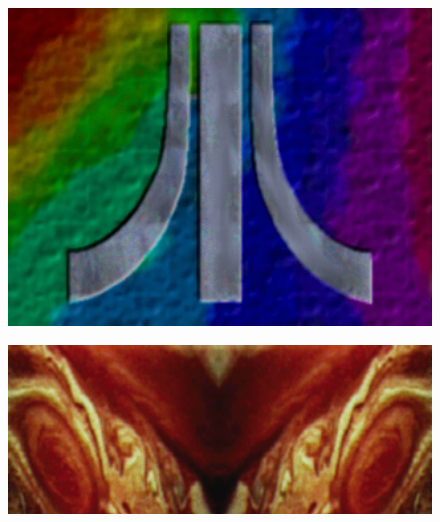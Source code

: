 \begin{minipage}[b]{0.48\linewidth}
\begin{figure}[H]
    \centering
    \begin{adjustbox}{width=6cm,center}
      \includegraphics[width=12cm]{cry/beasty5.png}%
    \end{adjustbox}
  \caption*{}
\end{figure}
\end{minipage}
\begin{minipage}[b]{0.48\linewidth}
\begin{figure}[H]
    \centering
    \begin{adjustbox}{width=6cm,center}
      \includegraphics[width=12cm]{cry/beasty6.png}%
    \end{adjustbox}
  \caption*{}
\end{figure}
\end{minipage}

